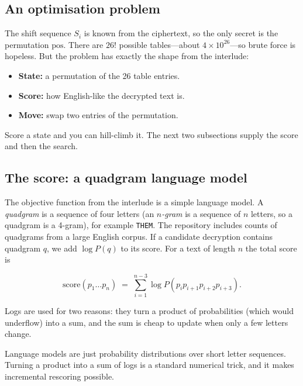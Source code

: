 \documentclass[11pt]{article}
\begin{document}
\subsection{An optimisation problem}

The shift sequence $S_i$ is known from the ciphertext, so the only secret is
the permutation $\mathrm{pos}$.  There are $26!$ possible tables---about
$4\times10^{26}$---so brute force is hopeless.  But the problem has exactly
the shape from the interlude:

\begin{itemize}
  \item \textbf{State:} a permutation of the 26 table entries.
  \item \textbf{Score:} how English-like the decrypted text is.
  \item \textbf{Move:} swap two entries of the permutation.
\end{itemize}

Score a state and you can hill-climb it.  The next two subsections supply the
score and then the search.

\subsection{The score: a quadgram language model}

The objective function from the interlude is a simple language model.  A
\emph{quadgram} is a sequence of four letters (an \emph{$n$-gram} is a
sequence of $n$ letters, so a quadgram is a 4-gram), for example
\texttt{THEM}.  The
repository includes counts of quadgrams from a large English corpus.  If a
candidate decryption contains quadgram $q$, we add $\log P(q)$ to its score.
For a text of length $n$ the total score is

\begin{equation}
\mathrm{score}(p_1\dots p_n) \;=\; \sum_{i=1}^{n-3} \log P(p_i p_{i+1} p_{i+2} p_{i+3}).
\end{equation}

Logs are used for two reasons: they turn a product of probabilities (which
would underflow) into a sum, and the sum is cheap to update when only a few
letters change.

\begin{lesson}
Language models are just probability distributions over short letter
sequences.  Turning a product into a sum of logs is a standard numerical trick,
and it makes incremental rescoring possible.
\end{lesson}
\end{document}
